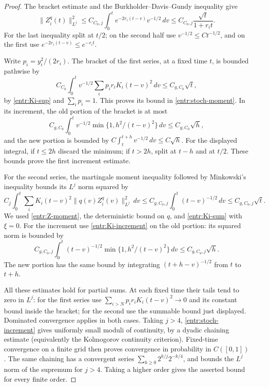 \begin{proof}
The bracket estimate and the Burkholder--Davis--Gundy inequality give
\[
 \|Z_i^q(t)\|_{L^j}^2
 \le C_{C_0,j}\int_0^t e^{-2r_i(t-v)}v^{-1/2}\,dv
 \le C_{C_0,j}\frac{\sqrt t}{1+r_it}.
\]
For the last inequality split at \(t/2\); on the second half use
\(v^{-1/2}\le C t^{-1/2}\), and on the first use
\(e^{-2r_i(t-v)}\le e^{-r_it}\).

Write \(p_i=y_i^2/(2r_i)\).  The bracket of the first series, at a
fixed time \(t\), is bounded pathwise by
\[
 C_{C_0}\int_0^t v^{-1/2}
       \sum_i p_i r_iK_i(t-v)^2\,dv
 \le C_{g,C_0}\sqrt t,
\]
by \eqref{entr:Ki-sup} and \(\sum_i p_i=1\).
This proves its bound in \eqref{entr:stoch-moment}.  In its increment,
the old portion of the bracket is at most
\[
 C_{g,C_0}\int_0^t v^{-1/2}
              \min\{1,h^2/(t-v)^2\}\,dv
 \le C_{g,C_0}\sqrt h ,
\]
and the new portion is bounded by
\(C\int_t^{t+h}v^{-1/2}\,dv\le C\sqrt h\).
For the displayed integral, if \(t\le2h\) discard the minimum; if
\(t>2h\), split at \(t-h\) and at \(t/2\).  These bounds prove the
first increment estimate.

For the second series, the martingale moment inequality followed by
Minkowski's inequality bounds its \(L^j\) norm squared by
\[
 C_j\int_0^t\sum_i K_i(t-v)^2
                      \|q(v)Z_i^q(v)\|_{L^j}^2\,dv
 \le C_{g,C_0,j}\int_0^t (t-v)^{-1/2}\,dv
 \le C_{g,C_0,j}\sqrt t.
\]
We used \eqref{entr:Z-moment}, the deterministic bound on \(q\), and
\eqref{entr:Ki-sum} with \(\xi=0\).
For the increment use \eqref{entr:Ki-increment} on the old portion:
its squared norm is bounded by
\[
 C_{g,C_0,j}\int_0^t (t-v)^{-1/2}
                \min\{1,h^2/(t-v)^2\}\,dv
 \le C_{g,C_0,j}\sqrt h .
\]
The new portion has the same bound by integrating
\((t+h-v)^{-1/2}\) from \(t\) to \(t+h\).

All these estimates hold for partial sums.  At each fixed time their
tails tend to zero in \(L^j\): for the first series use
\(\sum_{i>N}p_i r_iK_i(t-v)^2\to0\) and its constant bound inside
the bracket; for the second use the summable bound just displayed.
Dominated convergence applies in both cases.  Taking \(j>4\),
\eqref{entr:stoch-increment} gives uniformly small moduli of
continuity, by a dyadic chaining estimate (equivalently the
Kolmogorov continuity criterion).  Fixed-time convergence on a finite
grid then proves convergence in probability in \(C([0,1])\).
The same chaining has a convergent series
\(\sum_{k\ge0}2^{k/j}2^{-k/4}\), and bounds the \(L^j\) norm of the
supremum for \(j>4\).  Taking a higher order gives the asserted bound
for every finite order.
\end{proof}

